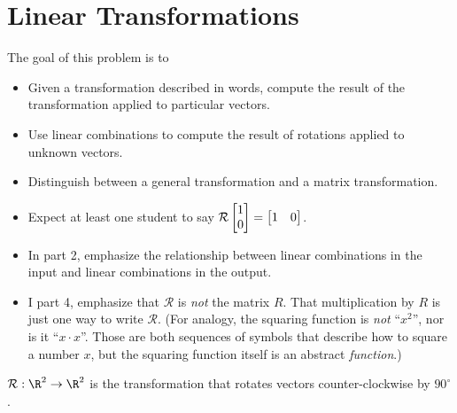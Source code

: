 \documentclass{problemset}
\newcommand{\bookonlynewpage}{\begin{bookonly}\newpage\end{bookonly}}
\begin{document}
	\bookonlynewpage
\section*{Linear Transformations}
\vspace{-1.5em}

	\question
	\begin{annotation}
		\begin{goals}

			The goal of this problem is to
			\begin{itemize}
				\item Given a transformation described in words, compute the result
					of the transformation applied to particular vectors.
				\item Use linear combinations to compute the result of rotations applied
					to unknown vectors.
				\item Distinguish between a general transformation and a matrix transformation.
			\end{itemize}
		\end{goals}

		\begin{notes}
			\begin{itemize}
				\item Expect at least one student to say $\mathcal R\mat{1\\0}=\mat{1&0}$.
				\item In part 2, emphasize the relationship between linear combinations
					in the input and linear combinations in the output.
				\item I part 4, emphasize that $\mathcal R$ is \emph{not} the matrix $R$.
					That multiplication by $R$ is just one way to write $\mathcal R$.
					(For analogy, the squaring function is \emph{not} ``$x^2$'', nor is it ``$x\cdot x$''.
					Those are both sequences of symbols that describe how to square a number $x$, but
					the squaring function itself is an abstract \emph{function}.)
					
			\end{itemize}
		\end{notes}
	\end{annotation}
	$\mathcal R:\R^2\to\R^2$ is the transformation that rotates vectors counter-clockwise
	by $90^\circ$.
\end{document}
